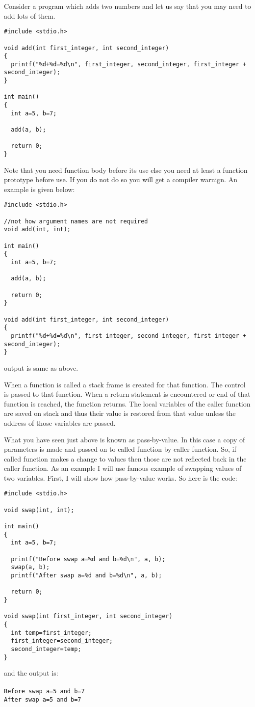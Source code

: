 Consider a program which adds two numbers and let us say that you may need to
add lots of them.

\begin{verbatim}
#include <stdio.h>

void add(int first_integer, int second_integer)
{
  printf("%d+%d=%d\n", first_integer, second_integer, first_integer + second_integer);
}

int main()
{
  int a=5, b=7;

  add(a, b);

  return 0;
}
\end{verbatim}
Note that you need function body before its use else you need at least a
function prototype before use. If you do not do so you will get a compiler
warnign. An example is given below:

\begin{verbatim}
#include <stdio.h>

//not how argument names are not required
void add(int, int);

int main()
{
  int a=5, b=7;

  add(a, b);

  return 0;
}

void add(int first_integer, int second_integer)
{
  printf("%d+%d=%d\n", first_integer, second_integer, first_integer + second_integer);
}
\end{verbatim}
output is same as above.

When a function is called a stack frame is created for that function. The
control is passed to that function. When a return statement is encountered or
end of that function is reached, the function returns. The local variables of
the caller function are saved on stack and thus their value is restored from
that value unless the address of those variables are passed.

What you have seen just above is known as pass-by-value. In this case a copy of
parameters is made and passed on to called function by caller function. So, if
called function makes a change to values then those are not reflected back in
the caller function. As an example I will use famous example of swapping values
of two variables. First, I will show how pass-by-value works. So here is the
code:

\begin{verbatim}
#include <stdio.h>

void swap(int, int);

int main()
{
  int a=5, b=7;

  printf("Before swap a=%d and b=%d\n", a, b);
  swap(a, b);
  printf("After swap a=%d and b=%d\n", a, b);

  return 0;
}

void swap(int first_integer, int second_integer)
{
  int temp=first_integer;
  first_integer=second_integer;
  second_integer=temp;
}
\end{verbatim}
and the output is:
\\\\\texttt{Before swap a=5 and b=7\\
After swap a=5 and b=7}

